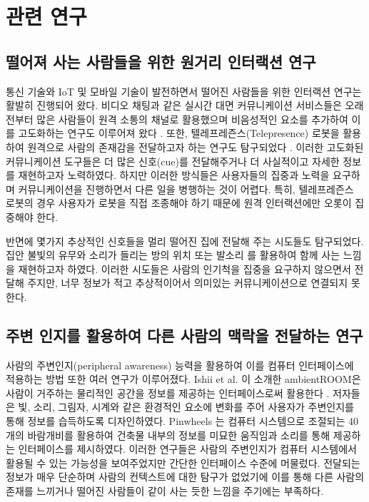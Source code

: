\chapter{관련 연구}
\label{sec:relatedwork}


\section{떨어져 사는 사람들을 위한 원거리 인터랙션 연구}

\noindent{}

통신 기술와 IoT 및 모바일 기술이 발전하면서 떨어진 사람들을 위한 인터랙션 연구는 활발히 진행되어 왔다. 비디오 채팅과 같은 실시간 대면 커뮤니케이션 서비스들은 오래전부터 많은 사람들이 원격 소통의 채널로 활용했으며 비음성적인 요소를 추가하여 이를 고도화하는 연구도 이루어져 왔다 \cite{judge2010sharing, kirk2010home, neustaedter2012intimacy}. 또한, 텔레프레즌스(Telepresence) 로봇을 활용하여 원격으로 사람의 존재감을 전달하고자 하는 연구도 탐구되었다 \cite{judge2010sharing, yang2017communicating}.
이러한 고도화된 커뮤니케이션 도구들은 더 많은 신호(cue)를 전달해주거나 더 사실적이고 자세한 정보를 재현하고자 노력하였다. 하지만 이러한 방식들은 사용자들의 집중과 노력을 요구하며 커뮤니케이션을 진행하면서 다른 일을 병행하는 것이 어렵다. 특히, 텔레프레즌스 로봇의 경우 사용자가 로봇을 직접 조종해야 하기 때문에 원격 인터랙션에만 오롯이 집중해야 한다.

반면에 몇가지 추상적인 신호들을 멀리 떨어진 집에 전달해 주는 시도들도 탐구되었다. 집안 불빛의 유무와 소리가 들리는 방의 위치 \cite{clark2015haunted} 또는 발소리 \cite{tunnermann2015upstairs} 를 활용하여 함께 사는 느낌을 재현하고자 하였다.
이러한 시도들은 사람의 인기척을 집중을 요구하지 않으면서 전달해 주지만, 너무 정보가 적고 추상적이어서 의미있는 커뮤니케이션으로 연결되지 못한다.

\section{주변 인지를 활용하여 다른 사람의 맥락을 전달하는 연구}

사람의 주변인지(peripheral awareness) 능력을 활용하여 이를 컴퓨터 인터페이스에 적용하는 방법 또한 여러 연구가 이루어졌다. Ishii et al. 이 소개한 ambientROOM은 사람이 거주하는 물리적인 공간을 정보를 제공하는 인터페이스로써 활용한다 \cite{ishii1998ambientroom}. 저자들은 빛, 소리, 그림자, 시계와 같은 환경적인 요소에 변화를 주어 사용자가 주변인지를 통해 정보를 습득하도록 디자인하였다. 
Pinwheels \cite{ishii2001pinwheels}는 컴퓨터 시스템으로 조절되는 40개의 바람개비를 활용하여 건축물 내부의 정보를 미묘한 움직임과 소리를 통해 제공하는 인터페이스를 제시하였다.
이러한 연구들은 사람의 주변인지가 컴퓨터 시스템에서 활용될 수 있는 가능성을 보여주었지만 간단한 인터페이스 수준에 머물렀다. 전달되는 정보가 매우 단순하며 사람의 컨텍스트에 대한 탐구가 없었기에 이를 통해 다른 사람의 존재를 느끼거나 떨어진 사람들이 같이 사는 듯한 느낌을 주기에는 부족하다.

